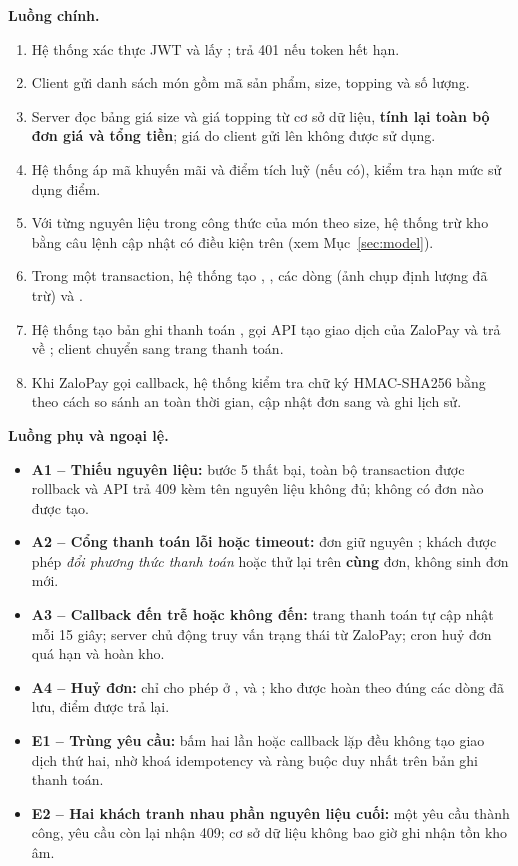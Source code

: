 ﻿\documentclass[12pt,a4paper]{article}
\begin{document}
\textbf{Luồng chính.}
\begin{enumerate}[label=\arabic*.,leftmargin=1.6em]
  \item Hệ thống xác thực JWT và lấy ; trả 401 nếu token hết hạn.
  \item Client gửi danh sách món gồm mã sản phẩm, size, topping và số lượng.
  \item Server đọc bảng giá size và giá topping từ cơ sở dữ liệu, \textbf{tính lại toàn bộ đơn giá và
        tổng tiền}; giá do client gửi lên không được sử dụng.
  \item Hệ thống áp mã khuyến mãi và điểm tích luỹ (nếu có), kiểm tra hạn mức sử dụng điểm.
  \item Với từng nguyên liệu trong công thức của món theo size, hệ thống trừ kho bằng câu lệnh cập
        nhật có điều kiện trên  (xem Mục~\ref{sec:model}).
  \item Trong một transaction, hệ thống tạo , , các dòng
         (ảnh chụp định lượng đã trừ) và .
  \item Hệ thống tạo bản ghi thanh toán , gọi API tạo giao dịch của ZaloPay và trả về
        ; client chuyển sang trang thanh toán.
  \item Khi ZaloPay gọi callback, hệ thống kiểm tra chữ ký HMAC-SHA256 bằng  theo cách so
        sánh an toàn thời gian, cập nhật đơn sang  và ghi lịch sử.
\end{enumerate}

\textbf{Luồng phụ và ngoại lệ.}
\begin{itemize}
  \item \textbf{A1 -- Thiếu nguyên liệu:} bước 5 thất bại, toàn bộ transaction được rollback và API
        trả 409 kèm tên nguyên liệu không đủ; không có đơn nào được tạo.
  \item \textbf{A2 -- Cổng thanh toán lỗi hoặc timeout:} đơn giữ nguyên ; khách được
        phép \emph{đổi phương thức thanh toán} hoặc thử lại trên \textbf{cùng} đơn, không sinh đơn mới.
  \item \textbf{A3 -- Callback đến trễ hoặc không đến:} trang thanh toán tự cập nhật mỗi 15 giây;
        server chủ động truy vấn trạng thái từ ZaloPay; cron huỷ đơn quá hạn và hoàn kho.
  \item \textbf{A4 -- Huỷ đơn:} chỉ cho phép ở ,  và ;
        kho được hoàn theo đúng các dòng  đã lưu, điểm được trả lại.
  \item \textbf{E1 -- Trùng yêu cầu:} bấm hai lần hoặc callback lặp đều không tạo giao dịch thứ hai,
        nhờ khoá idempotency và ràng buộc duy nhất trên bản ghi thanh toán.
  \item \textbf{E2 -- Hai khách tranh nhau phần nguyên liệu cuối:} một yêu cầu thành công, yêu cầu
        còn lại nhận 409; cơ sở dữ liệu không bao giờ ghi nhận tồn kho âm.
\end{itemize}
\end{document}
